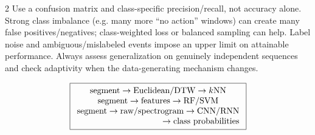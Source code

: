 \documentclass[9pt,a4paper]{extarticle}
\begin{document}
\begin{multicols}{2}
Use a confusion matrix and class-specific precision/recall, not accuracy alone. Strong class imbalance (e.g. many more ``no action'' windows) can create many false positives/negatives; class-weighted loss or balanced sampling can help. Label noise and ambiguous/mislabeled events impose an upper limit on attainable performance. Always assess generalization on genuinely independent sequences and check adaptivity when the data-generating mechanism changes.

\[
\boxed{\begin{array}{c}
\text{segment}\rightarrow\text{Euclidean/DTW}\rightarrow k\text{NN}\\
\text{segment}\rightarrow\text{features}\rightarrow\text{RF/SVM}\\
\text{segment}\rightarrow\text{raw/spectrogram}\rightarrow\text{CNN/RNN}\\
\hfill\rightarrow\text{class probabilities}
\end{array}}
\]

\end{multicols}
\end{document}
